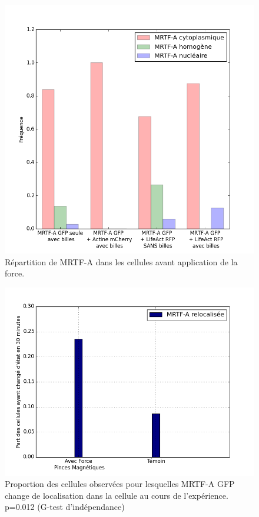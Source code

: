 \begin{figure}
\includegraphics[scale=0.4]{Figures/CHN_pinces.png} 
\caption{Répartition de MRTF-A dans les cellules avant application de la force. \label{CHN_pinces}}
\end{figure}

\begin{figure}
\includegraphics[scale=0.4]{Figures/Pinces_vs_temoin.png} 
\caption{\label{pinces_vs_temoin} Proportion des cellules observées pour lesquelles MRTF-A GFP change de localisation dans la cellule au cours de l'expérience. p=0.012 (G-test d'indépendance)}
\end{figure}




